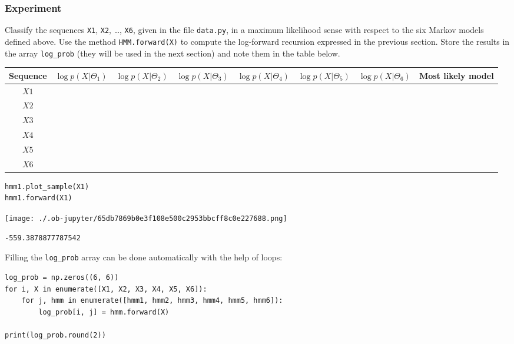 \documentclass[11pt]{article}
\begin{document}
\subsubsection{Experiment}
\label{sec:orgcec32a2}
Classify the sequences \texttt{X1}, \texttt{X2}, \ldots{}, \texttt{X6}, given in the file
\texttt{data.py}, in a maximum likelihood sense with respect to the six Markov
models defined above. Use the method \texttt{HMM.forward(X)} to compute the
log-forward recursion expressed in the previous section. Store the
results in the array \texttt{log\_prob} (they will be used in the next section)
and note them in the table below.

\begin{center}
\footnotesize
\begin{tabular}{|c|c|c|c|c|c|c|c|}
Sequence & \(\log p(X\vert\Theta_1)\) & \(\log p(X\vert\Theta_2)\) & \(\log p(X\vert\Theta_3)\) & \(\log p(X\vert  \Theta_4)\) & \(\log p(X\vert  \Theta_5)\) & \(\log p(X\vert  \Theta_6)\) & Most likely model\\
\hline
\(X1\) &  &  &  &  &  &  & \\
\(X2\) &  &  &  &  &  &  & \\
\(X3\) &  &  &  &  &  &  & \\
\(X4\) &  &  &  &  &  &  & \\
\(X5\) &  &  &  &  &  &  & \\
\(X6\) &  &  &  &  &  &  & \\
\end{tabular}
\end{center}

\begin{verbatim}
hmm1.plot_sample(X1)
hmm1.forward(X1)
\end{verbatim}

\begin{center}
\texttt{[image: ./.ob-jupyter/65db7869b0e3f108e500c2953bbcff8c0e227688.png]}
\end{center}
\begin{verbatim}
-559.3878877787542
\end{verbatim}

Filling the \texttt{log\_prob} array can be done automatically with the help of
loops:

\begin{verbatim}
log_prob = np.zeros((6, 6))
for i, X in enumerate([X1, X2, X3, X4, X5, X6]):
    for j, hmm in enumerate([hmm1, hmm2, hmm3, hmm4, hmm5, hmm6]):
        log_prob[i, j] = hmm.forward(X)

print(log_prob.round(2))
\end{verbatim}
\end{document}
